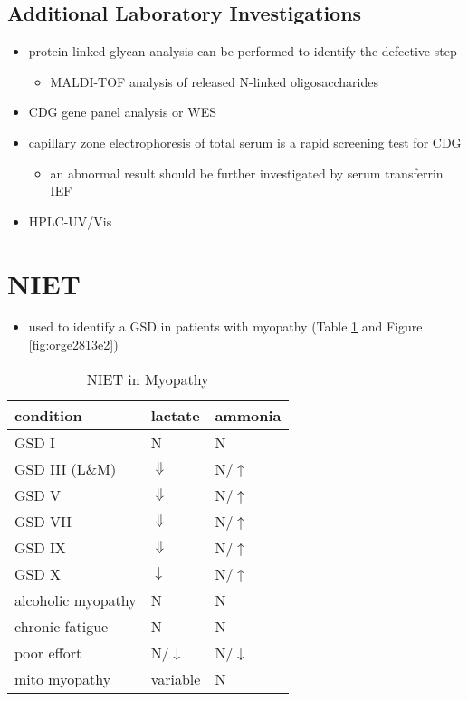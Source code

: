 \documentclass[12pt]{scrartcl}
\begin{document}
\subsection{Additional Laboratory Investigations}
\label{sec:org6e1cdc7}
\begin{itemize}
\item protein-linked glycan analysis can be performed to identify the defective step
\begin{itemize}
\item MALDI-TOF analysis of released N-linked oligosaccharides
\end{itemize}
\item CDG gene panel analysis or WES
\item capillary zone electrophoresis of total serum is a rapid screening
test for CDG
\begin{itemize}
\item an abnormal result should be further investigated by serum
transferrin IEF
\end{itemize}
\item HPLC-UV/Vis
\end{itemize}
\section{NIET}
\label{sec:org320148d}
\begin{itemize}
\item used to identify a GSD in patients with myopathy (Table
\ref{tab:orgc46f1fe} and Figure \ref{fig:orge2813e2})
\end{itemize}

\begin{table}[htbp]
\caption{\label{tab:orgc46f1fe}NIET in Myopathy}
\centering
\begin{tabular}{lll}
condition & lactate & ammonia\\
\hline
GSD I & N & N\\
GSD III (L\&M) & \(\Downarrow\) & N/\(\uparrow\)\\
GSD V & \(\Downarrow\) & N/\(\uparrow\)\\
GSD VII & \(\Downarrow\) & N/\(\uparrow\)\\
GSD IX & \(\Downarrow\) & N/\(\uparrow\)\\
GSD X & \(\downarrow\) & N/\(\uparrow\)\\
alcoholic myopathy & N & N\\
chronic fatigue & N & N\\
poor effort & N/\(\downarrow\) & N/\(\downarrow\)\\
mito myopathy & variable & N\\
\end{tabular}
\end{table}
\end{document}
